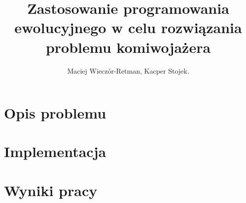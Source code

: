\documentclass{article}
\title{Zastosowanie programowania ewolucyjnego w celu rozwiązania problemu
    komiwojażera}
\author{Maciej Wieczór-Retman, Kacper Stojek.
}
\date{} %
\begin{document}
\maketitle

\section{Opis problemu}

\section{Implementacja}

\section{Wyniki pracy}
\end{document}
